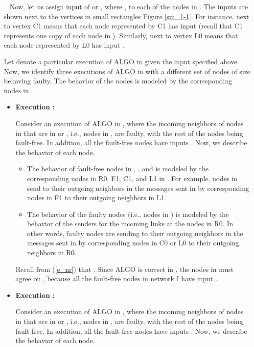 \documentclass[letterpaper, 11pt]{article}
\newenvironment{proof}{\noindent {\bf Proof:}~}{\hspace*{\fill}}
\begin{document}
\begin{proof}
Now, let us assign input of  or , where ,
to each of the nodes in . The inputs are shown next to the
vertices in small rectangles Figure \ref{sm_1-1}.
For instance,  next to vertex C1 means that each node
represented by C1 has input  (recall that C1 represents
one copy of each node in ). 
Similarly,  next to vertex L0 means that each node
represented by L0 has input .



Let  denote a particular execution of ALGO in  given the input specified above. Now, we identify three executions of ALGO in  with a different set of nodes of size  behaving faulty. The behavior of the nodes is modeled by the corresponding nodes in .

\begin{itemize}
\item {\bf Execution :}

Consider an execution  of ALGO in , where the incoming neighbors of nodes in  that are in  or , i.e., nodes in , are faulty, with the rest of the nodes being fault-free. In addition, all the fault-free nodes
have inputs . Now, we describe the behavior of each node.

\begin{itemize}
\item The behavior of fault-free nodes in , ,  and  is modeled by the corresponding nodes in R0, F1, C1, and L1 in . For example, nodes in  send to their outgoing neighbors in  the messages sent in  by corresponding nodes in F1 to their outgoing neighbors in L1.

\item The behavior of the faulty nodes (i.e., nodes in ) is modeled by the behavior of the senders for the incoming links at the nodes in R0. In other words, faulty nodes are sending to their outgoing neighbors in  the messages sent in  by corresponding nodes in C0 or L0 to their outgoing neighbors in R0.
\end{itemize}
Recall from (\ref{e_nr}) that . Since ALGO is correct in , the nodes in  must agree on , because all the fault-free nodes in network I have input .




\item {\bf Execution :}

Consider an execution  of ALGO in , where the incoming neighbors of nodes in  that are in  or , i.e., nodes in , are faulty, with the rest of the nodes being fault-free. In addition, all the fault-free
nodes have inputs . Now, we describe the behavior of each node.


\end{itemize}
\end{proof}
\end{document}
